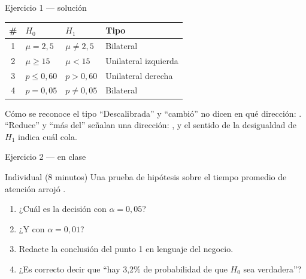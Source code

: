 \documentclass[aspectratio=169,10pt]{beamer}
\begin{document}
\begin{frame}{Ejercicio 1 — solución}
  \footnotesize
  \begin{center}
  \begin{tabular}{@{}clll@{}}
    \toprule
    \textbf{\#} & \textbf{$H_0$} & \textbf{$H_1$} & \textbf{Tipo} \\
    \midrule
    1 & $\mu=2{,}5$    & $\mu\neq 2{,}5$ & Bilateral \\
    2 & $\mu\ge 15$    & $\mu<15$        & Unilateral izquierda \\
    3 & $p\le 0{,}60$  & $p>0{,}60$      & Unilateral derecha \\
    4 & $p=0{,}05$     & $p\neq 0{,}05$  & Bilateral \\
    \bottomrule
  \end{tabular}
  \end{center}

  \vspace{0.25cm}
  \begin{exampleblock}{Cómo se reconoce el tipo}
    \footnotesize
    ``Descalibrada'' y ``cambió'' no dicen en qué dirección: .
    ``Reduce'' y ``más del'' señalan una dirección: , y el
    sentido de la desigualdad de $H_1$ indica cuál cola.
  \end{exampleblock}
\end{frame}

\begin{frame}{Ejercicio 2 — en clase}
  \begin{alertblock}{Individual (8 minutos)}
    Una prueba de hipótesis sobre el tiempo promedio de atención arrojó
    .

    \vspace{0.25cm}
    \begin{enumerate}
      \item ¿Cuál es la decisión con $\alpha=0{,}05$?
      \item ¿Y con $\alpha=0{,}01$?
      \item Redacte la conclusión del punto 1 en lenguaje del negocio.
      \item ¿Es correcto decir que ``hay 3,2\% de probabilidad de que $H_0$
            sea verdadera''?
    \end{enumerate}
  \end{alertblock}
\end{frame}
\end{document}
